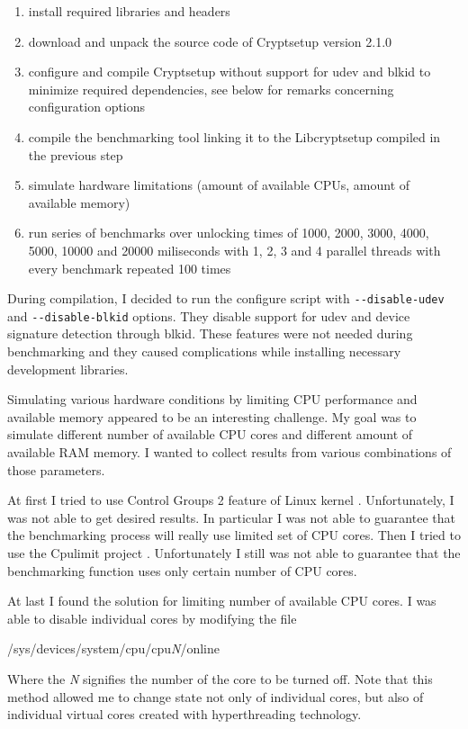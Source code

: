 \documentclass[nolof]{fithesis3}
\begin{document}
\begin{enumerate}
\item install required libraries and headers

\item download and unpack the source code of Cryptsetup version 2.1.0

\item configure and compile Cryptsetup without support for udev and blkid to minimize required dependencies, see below for remarks concerning configuration options

\item compile the benchmarking tool linking it to the Libcryptsetup compiled in the previous step

\item simulate hardware limitations (amount of available CPUs, amount of available memory)

\item run series of benchmarks over unlocking times of 1000, 2000, 3000, 4000, 5000, 10000 and 20000 miliseconds with 1, 2, 3 and 4 parallel threads with every benchmark repeated 100 times
\end{enumerate}

During compilation, I decided to run the configure script with \verb+--disable-udev+ and \verb+--disable-blkid+ options. They disable support for udev and device signature detection through blkid. These features were not needed during benchmarking and they caused complications while installing necessary development libraries.

Simulating various hardware conditions by limiting CPU performance and available memory appeared to be an interesting challenge. My goal was to simulate different number of available CPU cores and different amount of available RAM memory. I wanted to collect results from various combinations of those parameters.

At first I tried to use Control Groups 2 feature of Linux kernel \parencite{cgroups2}. Unfortunately, I was not able to get desired results. In particular I was not able to guarantee that the benchmarking process will really use limited set of CPU cores. Then I tried to use the Cpulimit project \parencite{cpulimit}. Unfortunately I still was not able to guarantee that the benchmarking function uses only certain number of CPU cores.

At last I found the solution for limiting number of available CPU cores. I was able to disable individual cores by modifying the file 
\begin{tt}
/sys/devices/system/cpu/cpu\emph{N}/online
\end{tt}
 Where the \emph{N} signifies the number of the core to be turned off. Note that this method allowed me to change state not only of individual cores, but also of individual virtual cores created with hyperthreading technology.
\end{document}
